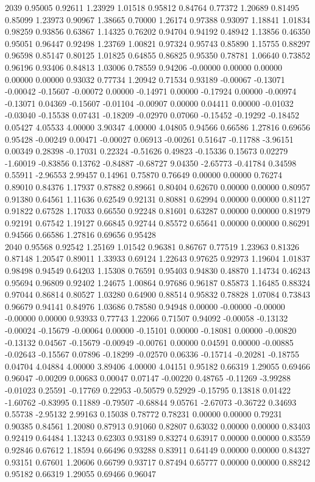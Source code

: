 {2039 0.95005 0.92611 1.23929 1.01518 0.95812 0.84764 0.77372 1.20689 0.81495 0.85099 1.23973 0.90967 1.38665 0.70000 1.26174 0.97388 0.93097 1.18841 1.01834 0.98259 0.93856 0.63867 1.14325 0.76202 0.94704 0.94192 0.48942 1.13856 0.46350 0.95051 0.96447 0.92498 1.23769 1.00821 0.97324 0.95743 0.85890 1.15755 0.88297 0.96598 0.85147 0.80125 1.01825 0.64855 0.86825 0.95350 0.78781 1.06640 0.73852 0.96196 0.93406 0.84813 1.03006 0.78559 0.94206 -0.00000 0.00000 0.00000 0.00000 0.00000 0.93032 0.77734 1.20942 0.71534 0.93189 -0.00067 -0.13071 -0.00042 -0.15607 -0.00072 0.00000 -0.14971 0.00000 -0.17924 0.00000 -0.00974 -0.13071 0.04369 -0.15607 -0.01104 -0.00907 0.00000 0.04411 0.00000 -0.01032 -0.03040 -0.15538 0.07431 -0.18209 -0.02970 0.07060 -0.15452 -0.19292 -0.18452 0.05427 4.05533 4.00000 3.90347 4.00000 4.04805 0.94566 0.66586 1.27816 0.69656 0.95428 -0.00249 0.00471 -0.00027 0.06913 -0.00261 0.51647 -0.11788 -3.96151 0.00349 0.28398 -0.17031 0.22324 -0.51626 0.49823 -0.15336 0.15673 0.02279 -1.60019 -0.83856 0.13762 -0.84887 -0.68727 9.04350 -2.65773 -0.41784 0.34598 0.55911 -2.96553 2.99457 0.14961 0.75870 0.76649 0.00000 0.00000 0.76274 0.89010 0.84376 1.17937 0.87882 0.89661 0.80404 0.62670 0.00000 0.00000 0.80957 0.91380 0.64561 1.11636 0.62549 0.92131 0.80881 0.62994 0.00000 0.00000 0.81127 0.91822 0.67528 1.17033 0.66550 0.92248 0.81601 0.63287 0.00000 0.00000 0.81979 0.92191 0.67542 1.19127 0.66845 0.92744 0.85572 0.65641 0.00000 0.00000 0.86291 0.94566 0.66586 1.27816 0.69656 0.95428 \\
2040 0.95568 0.92542 1.25169 1.01542 0.96381 0.86767 0.77519 1.23963 0.81326 0.87148 1.20547 0.89011 1.33933 0.69124 1.22643 0.97625 0.92973 1.19604 1.01837 0.98498 0.94549 0.64203 1.15308 0.76591 0.95403 0.94830 0.48870 1.14734 0.46243 0.95694 0.96809 0.92402 1.24675 1.00864 0.97686 0.96187 0.85873 1.16485 0.88324 0.97044 0.86814 0.80527 1.03280 0.64900 0.88514 0.95832 0.78828 1.07084 0.73843 0.96679 0.94141 0.84976 1.03686 0.78580 0.94948 0.00000 -0.00000 -0.00000 -0.00000 0.00000 0.93933 0.77743 1.22066 0.71507 0.94092 -0.00058 -0.13132 -0.00024 -0.15679 -0.00064 0.00000 -0.15101 0.00000 -0.18081 0.00000 -0.00820 -0.13132 0.04567 -0.15679 -0.00949 -0.00761 0.00000 0.04591 0.00000 -0.00885 -0.02643 -0.15567 0.07896 -0.18299 -0.02570 0.06336 -0.15714 -0.20281 -0.18755 0.04704 4.04884 4.00000 3.89406 4.00000 4.04151 0.95182 0.66319 1.29055 0.69466 0.96047 -0.00209 0.00683 0.00047 0.07147 -0.00220 0.48765 -0.11269 -3.99288 -0.01023 0.25591 -0.17769 0.22953 -0.50579 0.52929 -0.15795 0.13818 0.01422 -1.60762 -0.83995 0.11889 -0.79507 -0.68844 9.05761 -2.67073 -0.36722 0.34693 0.55738 -2.95132 2.99163 0.15038 0.78772 0.78231 0.00000 0.00000 0.79231 0.90385 0.84561 1.20080 0.87913 0.91060 0.82807 0.63032 0.00000 0.00000 0.83403 0.92419 0.64484 1.13243 0.62303 0.93189 0.83274 0.63917 0.00000 0.00000 0.83559 0.92846 0.67612 1.18594 0.66496 0.93288 0.83911 0.64149 0.00000 0.00000 0.84327 0.93151 0.67601 1.20606 0.66799 0.93717 0.87494 0.65777 0.00000 0.00000 0.88242 0.95182 0.66319 1.29055 0.69466 0.96047 \\
}
